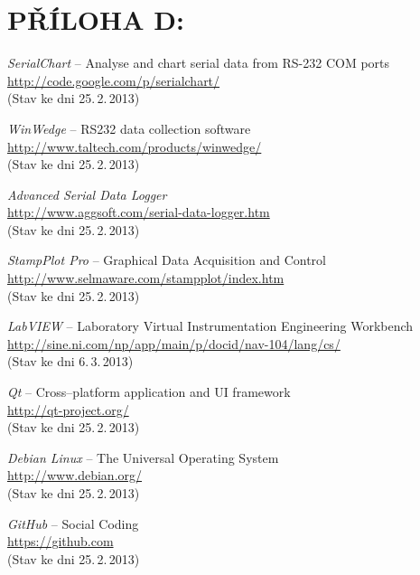 \documentclass[12pt, a4paper, oneside]{article}
\newcommand{\It}{\textit}  %
\begin{document}
 \section*{PŘÍLOHA D:}
 \begin{thebibliography}{99}

     \It{SerialChart} -- Analyse and chart serial data from RS-232 COM ports \\
    \url{http://code.google.com/p/serialchart/}\\
    (Stav ke dni 25.\,2.\,2013)

     \It{WinWedge} -- RS232 data collection software \\
    \url{http://www.taltech.com/products/winwedge/}\\
    (Stav ke dni 25.\,2.\,2013)

     \It{Advanced Serial Data Logger} \\
    \url{http://www.aggsoft.com/serial-data-logger.htm}\\
    (Stav ke dni 25.\,2.\,2013)

     \It{StampPlot Pro} -- Graphical Data Acquisition and Control \\
    \url{http://www.selmaware.com/stampplot/index.htm}\\
    (Stav ke dni 25.\,2.\,2013)

     \It{LabVIEW} -- Laboratory Virtual Instrumentation Engineering Workbench \\
    \url{http://sine.ni.com/np/app/main/p/docid/nav-104/lang/cs/}\\
    (Stav ke dni 6.\,3.\,2013)

     \It{Qt} -- Cross--platform application and UI framework \\
    \url{http://qt-project.org/}\\
    (Stav ke dni 25.\,2.\,2013)

     \It{Debian Linux} -- The Universal Operating System \\
    \url{http://www.debian.org/}\\
    (Stav ke dni 25.\,2.\,2013)

     \It{GitHub} -- Social Coding \\
    \url{https://github.com}\\
    (Stav ke dni 25.\,2.\,2013)


\end{thebibliography}
\end{document}
